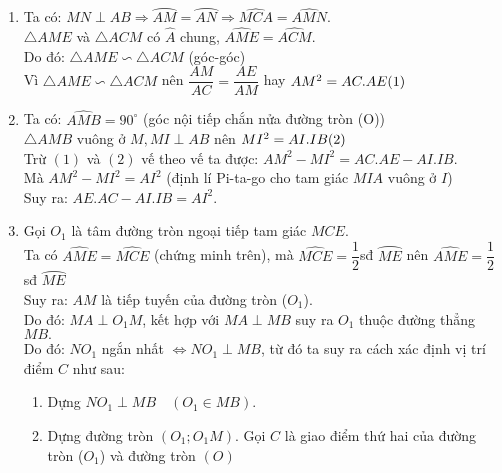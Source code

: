 \begin{bt}
{\begin{enumerate}
			\item Ta có: $MN  \perp  AB \Rightarrow \wideparen{AM}=\wideparen{AN}\Rightarrow \widehat{MCA}=\widehat{AMN}.$\\
			$\triangle AME$ và $\triangle ACM$ có $\widehat{A}$ chung, $\widehat{AME}=\widehat{ACM}.$\\
			Do đó: $\triangle AME \backsim \triangle ACM$ (góc-góc)\\
			Vì $\triangle AME \backsim \triangle ACM$ nên $\dfrac{AM}{AC}=\dfrac{AE}{AM}$ hay $ AM^2=AC. AE \hfill(1)$
			
			\item Ta có: $\widehat{AMB}=90^\circ$ (góc nội tiếp chắn nửa đường tròn (O))\\
			$\triangle AMB$ vuông ở $M, MI \perp AB$ nên $MI^2 = AI.IB \hfill (2)$\\
			Trừ $(1)$ và $(2)$ vế theo vế ta được: $AM^2-MI^2=AC. AE-AI.IB$.\\
			Mà $AM^2-MI^2=AI^2$ (định lí Pi-ta-go cho tam giác $MIA$ vuông ở $I$)\\
			Suy ra: $AE.AC-AI.IB = AI^2.$
			
			\item Gọi $O_1$ là tâm đường tròn ngoại tiếp tam giác $MCE.$\\
			Ta có $\widehat{AME}=\widehat{MCE}$ (chứng minh trên), mà $\widehat{MCE}=\dfrac{1}{2}$sđ $\wideparen{ME}$ nên $\widehat{AME}=\dfrac{1}{2}$sđ $\wideparen{ME}$\\
			Suy ra: $ AM $ là tiếp tuyến của đường tròn ($O_1$).\\
			Do đó: $MA  \perp O_1M$, kết hợp với $MA  \perp  MB$ suy ra $O_1$ thuộc đường thẳng $MB.$\\
			Do đó: $NO_1$ ngắn nhất $\Leftrightarrow NO_1 \perp MB$, từ đó ta suy ra cách xác định vị trí điểm $ C $
			như sau:
			\begin{enumerate}[+]
				\item  Dựng $NO_1 \perp  MB \quad (O_1\in MB).$\\
				\item  Dựng đường tròn $(O_1; O_1M).$ Gọi $ C $ là giao điểm thứ hai của đường tròn ($O_1$) và đường tròn $ (O) $
			\end{enumerate}
			
		\end{enumerate}
	}
\end{bt}

